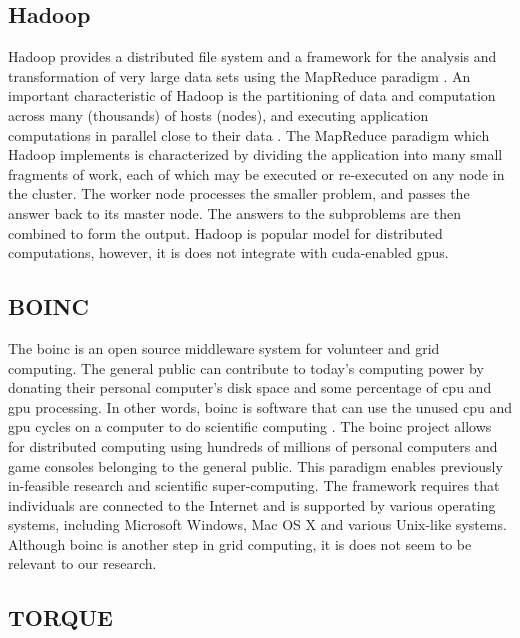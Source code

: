 \subsection{Hadoop}

Hadoop provides a distributed file system and a framework
for the analysis and transformation of very large data sets using the MapReduce
paradigm \cite{website:Apache-Hadoop} \cite{website:Apress} \cite{dias2011hpc}
\cite{dean2001mapreduce}. An important characteristic of Hadoop is the
partitioning of data and computation across many (thousands) of hosts (nodes),
and executing application computations in parallel close to their data
\cite{shvachko2011apache}. The MapReduce \cite{luo2011hierarchical}
\cite{website:Hadoop-Wiki-map} paradigm which Hadoop implements is
characterized by dividing the application into many small fragments of work,
each of which may be executed or re-executed on any node in the cluster. The
worker node processes the smaller problem, and passes the answer back to its
master node. The answers to the subproblems are then combined to form the
output. Hadoop is popular model for distributed computations, however, it is
does not integrate with \gls{cuda}-enabled \glspl{gpu}.

\subsection{BOINC}

The \Gls{boinc} is an open source middleware system for volunteer and grid
computing. The general public can contribute to today's computing power by
donating their personal computer's disk space and some percentage of \gls{cpu}
and \gls{gpu} processing. In other words, \gls{boinc} is software that can use
the unused \gls{cpu} and \gls{gpu} cycles on a computer to do scientific
computing \cite{anderson2004boinc}. The \gls{boinc} project allows for
distributed computing using hundreds of millions of personal computers and game
consoles belonging to the general public. This paradigm enables previously
in-feasible research and scientific super-computing. The framework requires
that individuals are connected to the Internet and is supported by various
operating systems, including Microsoft Windows, Mac OS X and various Unix-like
systems. Although \gls{boinc} is another step in grid computing, it is does
not seem to be relevant to our research.

\subsection{TORQUE}

